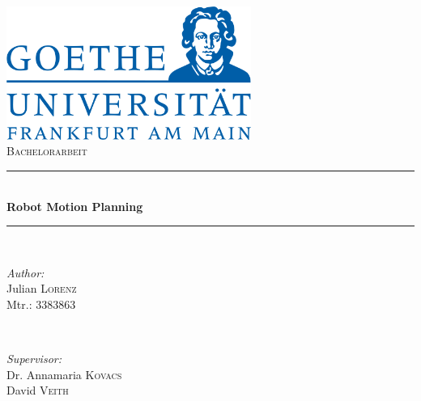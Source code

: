 \documentclass[12pt,a4paper,titlepage]{article}
\begin{document}
\begin{titlepage}
\label{01: titlepage}

\newcommand{\HRule}{\rule{\linewidth}{0.5mm}} %

\center %
 
\label{Heading}
\includegraphics[width=8cm]{pictures/logo.png}\\[1.5cm] %
\textsc{\Large Bachelorarbeit}\\[0.5cm] %

\label{Title Section}
\HRule \\[0.4cm]
{ \huge \bfseries Robot Motion Planning}\\[0.4cm] %
\HRule \\[1.5cm]
 
\label{Author}
\begin{minipage}{0.4\textwidth}
\begin{flushleft} \large
\emph{Author:}\\
Julian \textsc{Lorenz}\\
Mtr.: 3383863 %
\end{flushleft}
\end{minipage}
~
\begin{minipage}{0.4\textwidth}
\begin{flushright} \large
\emph{Supervisor:} \\
Dr. Annamaria \textsc{Kovacs}\\
David \textsc{Veith}
\end{flushright}
\end{minipage}\\[4cm]



\end{titlepage}
\end{document}
